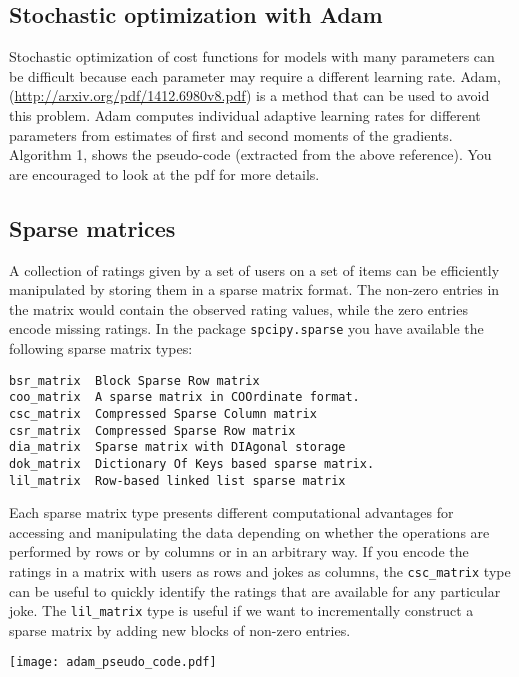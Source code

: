 \documentclass{harvardml}
\theoremstyle{plain}
\begin{document}
\subsection*{Stochastic optimization with Adam}

Stochastic optimization of cost functions for models with many parameters can
be difficult because each parameter may require a different learning
rate. Adam,
(\url{http://arxiv.org/pdf/1412.6980v8.pdf})
is a method that can be used to avoid this problem. Adam computes individual
adaptive learning rates for different parameters from estimates of first and
second moments of the gradients. Algorithm 1, shows the pseudo-code (extracted from the above
reference). You are encouraged to look at the pdf
for more details.

\subsection*{Sparse matrices}

A collection of ratings given by a set of users on a set of items can be
efficiently manipulated by storing them in a sparse matrix format. The non-zero
entries in the matrix would contain the observed rating values, while the zero
entries encode missing ratings. In the package \texttt{spcipy.sparse} you
have available the following sparse matrix types:

{\footnotesize
\begin{verbatim}
bsr_matrix  Block Sparse Row matrix
coo_matrix  A sparse matrix in COOrdinate format.
csc_matrix  Compressed Sparse Column matrix
csr_matrix  Compressed Sparse Row matrix
dia_matrix  Sparse matrix with DIAgonal storage
dok_matrix  Dictionary Of Keys based sparse matrix.
lil_matrix  Row-based linked list sparse matrix
\end{verbatim}
}

Each sparse matrix type presents different computational advantages for
accessing and manipulating the data depending on whether the operations are
performed by rows or by columns or in an arbitrary way. If you encode the
ratings in a matrix with users as rows and jokes as columns, the
\texttt{csc\_matrix} type can be useful to quickly identify the ratings that
are available for any particular joke. The \texttt{lil\_matrix} type is useful
if we want to incrementally construct a sparse matrix by adding new blocks of
non-zero entries.

\begin{center}
\texttt{[image: adam\_pseudo\_code.pdf]}
\end{center}
\end{document}
